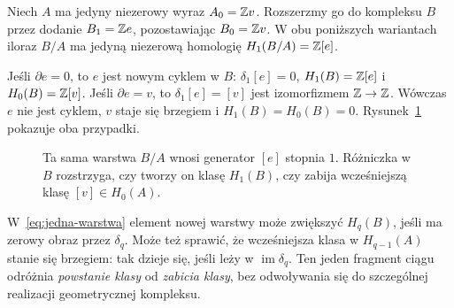 \begin{przyklad}
Niech $A$ ma jedyny niezerowy wyraz $A_0=\mathbb{Z} v$.
Rozszerzmy go do kompleksu $B$ przez dodanie
$B_1=\mathbb{Z} e$, pozostawiając $B_0=\mathbb{Z} v$.
W obu poniższych wariantach iloraz $B/A$
ma jedyną niezerową homologię
$H_1(B/A)=\mathbb{Z}[e]$.

Jeśli $\partial e=0$, to $e$ jest nowym cyklem w $B$:
$\delta_1[e]=0$, $H_1(B)=\mathbb{Z}[e]$ i $H_0(B)=\mathbb{Z}[v]$.
Jeśli $\partial e=v$, to $\delta_1[e]=[v]$ jest
izomorfizmem $\mathbb{Z}\to\mathbb{Z}$. Wówczas $e$ nie jest cyklem,
$v$ staje się brzegiem i $H_1(B)=H_0(B)=0$.
Rysunek~\ref{fig:filtracja-klasy} pokazuje oba przypadki.
\end{przyklad}

\begin{figure}[!htbp]
\centering
{}
\caption{Ta sama warstwa $B/A$ wnosi generator $[e]$ stopnia $1$.
Różniczka w $B$ rozstrzyga, czy tworzy on klasę $H_1(B)$,
czy zabija wcześniejszą klasę $[v]\in H_0(A)$.}
\label{fig:filtracja-klasy}
\end{figure}

\begin{uwaga}
W~\eqref{eq:jedna-warstwa} element
nowej warstwy może zwiększyć
$H_q(B)$, jeśli ma zerowy obraz
przez $\delta_q$. Może też sprawić,
że wcześniejsza klasa w
$H_{q-1}(A)$ stanie się brzegiem:
tak dzieje się, jeśli leży w
$\operatorname{im}\delta_q$.
Ten jeden fragment ciągu odróżnia
\emph{powstanie klasy} od
\emph{zabicia klasy}, bez odwoływania
się do szczególnej realizacji
geometrycznej kompleksu.
\end{uwaga}
